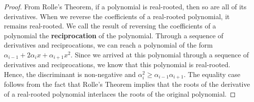 \documentclass{puthesis-UG}
\begin{document}
\begin{proof}
	From Rolle's Theorem, if a polynomial is real-rooted, then so are all of its derivatives. When we reverse the coefficients of a real-rooted polynomial, it remains real-rooted. We call the result of reversing the coefficients of a polynomial the \textbf{reciprocation} of the polynomial. Through a sequence of derivatives and reciprocations, we can reach a polynomial of the form $\alpha_{i-1} + 2\alpha_i x + \alpha_{i+1} x^2$. Since we arrived at this polynomial through a sequence of derivatives and reciprocations, we know that this polynomial is real-rooted. Hence, the discriminant is non-negative and $\alpha_i^2 \geq \alpha_{i-1} \alpha_{i+1}$. The equality case follows from the fact that Rolle's Theorem implies that the roots of the derivative of a real-rooted polynomial interlaces the roots of the original polynomial. 
\end{proof}
\end{document}
